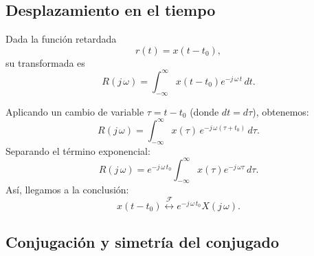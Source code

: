 \documentclass[11pt,a4paper,openany]{book}
\begin{document}
\subsection{Desplazamiento en el tiempo}

Dada la función retardada
\begin{equation}
	r(t) = x(t - t_{0}) ,
\end{equation}
su transformada es
\begin{equation}
	R(j \, \omega) = \int_{-\infty}^{\infty} x(t - t_{0}) e^{-j \, \omega \, t} \, dt.
\end{equation}

Aplicando un cambio de variable $\tau = t - t_{0}$ (donde $dt = d\tau$), obtenemos:
\begin{equation}
	R(j \, \omega) = \int_{-\infty}^{\infty} x(\tau) \, e^{-j \, \omega (\tau + t_{0})} \, d\tau.
\end{equation}
Separando el término exponencial:
\begin{equation}
	R(j \, \omega) = e^{-j \, \omega \, t_{0}} \int_{-\infty}^{\infty} x(\tau) e^{-j \, \omega \tau} \, d\tau.
\end{equation}
Así, llegamos a la conclusión:
\begin{equation}
	x(t - t_{0}) \stackrel{\mathcal{F}}{\longleftrightarrow} e^{-j \, \omega \, t_{0}} X(j \, \omega) .
\end{equation}

\subsection{Conjugación y simetría del conjugado}
\end{document}
